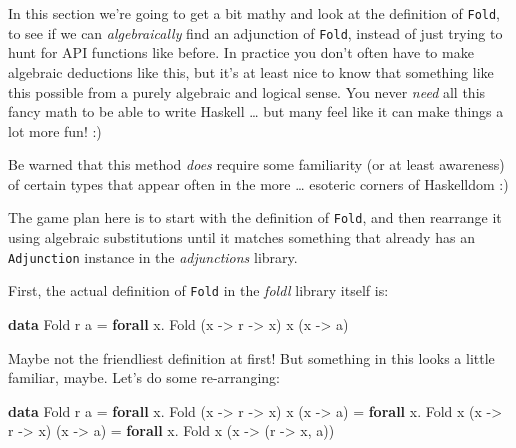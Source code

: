 \documentclass[]{article}
\newenvironment{Shaded}{}{}
\newcommand{\DataTypeTok}[1]{\textcolor[rgb]{0.56,0.13,0.00}{#1}}
\newcommand{\KeywordTok}[1]{\textcolor[rgb]{0.00,0.44,0.13}{\textbf{#1}}}
\newcommand{\NormalTok}[1]{#1}
\newcommand{\OperatorTok}[1]{\textcolor[rgb]{0.40,0.40,0.40}{#1}}
\newcommand{\OtherTok}[1]{\textcolor[rgb]{0.00,0.44,0.13}{#1}}
\begin{document}
In this section we're going to get a bit mathy and look at the definition of
\texttt{Fold}, to see if we can \emph{algebraically} find an adjunction of
\texttt{Fold}, instead of just trying to hunt for API functions like before. In
practice you don't often have to make algebraic deductions like this, but it's
at least nice to know that something like this possible from a purely algebraic
and logical sense. You never \emph{need} all this fancy math to be able to write
Haskell \ldots{} but many feel like it can make things a lot more fun! :)

Be warned that this method \emph{does} require some familiarity (or at least
awareness) of certain types that appear often in the more \ldots{} esoteric
corners of Haskelldom :)

The game plan here is to start with the definition of \texttt{Fold}, and then
rearrange it using algebraic substitutions until it matches something that
already has an \texttt{Adjunction} instance in the \emph{adjunctions} library.

First, the actual definition of \texttt{Fold} in the \emph{foldl} library itself
is:

\begin{Shaded}
\begin{Highlighting}[]
\KeywordTok{data} \DataTypeTok{Fold}\NormalTok{ r a }\OtherTok{=} \KeywordTok{forall}\NormalTok{ x}\OperatorTok{.} \DataTypeTok{Fold}\NormalTok{ (x }\OtherTok{{-}>}\NormalTok{ r }\OtherTok{{-}>}\NormalTok{ x) x (x }\OtherTok{{-}>}\NormalTok{ a)}
\end{Highlighting}
\end{Shaded}

Maybe not the friendliest definition at first! But something in this looks a
little familiar, maybe. Let's do some re-arranging:

\begin{Shaded}
\begin{Highlighting}[]
\KeywordTok{data} \DataTypeTok{Fold}\NormalTok{ r a }\OtherTok{=} \KeywordTok{forall}\NormalTok{ x}\OperatorTok{.} \DataTypeTok{Fold}\NormalTok{ (x }\OtherTok{{-}>}\NormalTok{ r }\OtherTok{{-}>}\NormalTok{ x) x (x }\OtherTok{{-}>}\NormalTok{ a)}
              \OtherTok{=} \KeywordTok{forall}\NormalTok{ x}\OperatorTok{.} \DataTypeTok{Fold}\NormalTok{ x (x }\OtherTok{{-}>}\NormalTok{ r }\OtherTok{{-}>}\NormalTok{ x) (x }\OtherTok{{-}>}\NormalTok{ a)}
              \OtherTok{=} \KeywordTok{forall}\NormalTok{ x}\OperatorTok{.} \DataTypeTok{Fold}\NormalTok{ x (x }\OtherTok{{-}>}\NormalTok{ (r }\OtherTok{{-}>}\NormalTok{ x, a))}
\end{Highlighting}
\end{Shaded}
\end{document}
